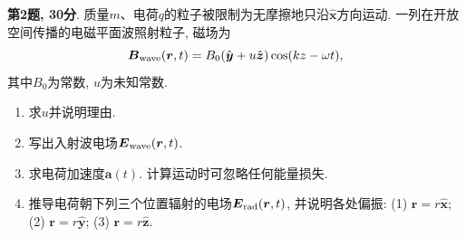 \begin{exercise}
\textbf{第2题, 30分}. \label{exam:f3.2}
质量$m$、电荷$q$的粒子被限制为无摩擦地只沿$\hat{\boldsymbol x}$方向运动. 一列在开放空间传播的电磁平面波照射粒子, 磁场为
\[
\boldsymbol B_{\rm wave}(\boldsymbol r,t)=B_0(\hat{\boldsymbol y}+u\hat{\boldsymbol z})\cos(kz-\omega t),
\]
其中$B_0$为常数, $u$为未知常数.
\begin{enumerate}[label=(\alph*)]
\item 求$u$并说明理由.
\item 写出入射波电场$\boldsymbol E_{\rm wave}(\boldsymbol r,t)$.
\item 求电荷加速度$\boldsymbol a(t)$. 计算运动时可忽略任何能量损失.
\item 推导电荷朝下列三个位置辐射的电场$\boldsymbol E_{\rm rad}(\boldsymbol r,t)$, 并说明各处偏振: (1) $\boldsymbol r=r\hat{\boldsymbol x}$; (2) $\boldsymbol r=r\hat{\boldsymbol y}$; (3) $\boldsymbol r=r\hat{\boldsymbol z}$.
\end{enumerate}
\end{exercise}
